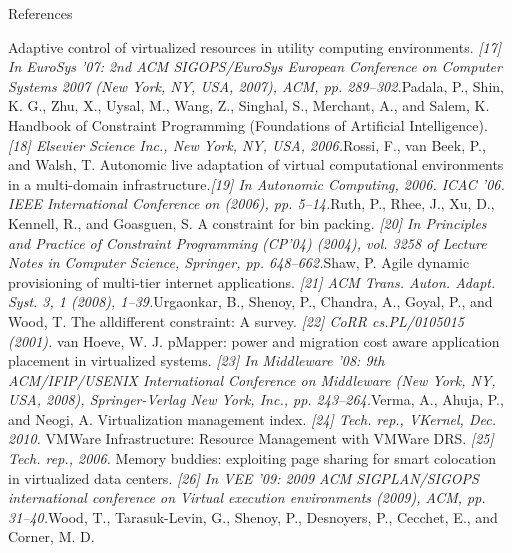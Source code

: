 \begin{frame}[allowframebreaks]{References}
\begin{thebibliography}{2}
{\beamertemplatearticlebibitems {} Adaptive control of virtualized resources in utility computing environments. \newblock\emph{[17] In EuroSys ’07: 2nd ACM SIGOPS/EuroSys European Conference on Computer Systems 2007 (New York, NY, USA, 2007), ACM, pp. 289–302.}\newblock Padala, P., Shin, K. G., Zhu, X., Uysal, M., Wang, Z., Singhal, S., Merchant, A., and Salem, K.
\beamertemplatearticlebibitems {} Handbook of Constraint Programming (Foundations of Artificial Intelligence). \newblock\emph{[18] Elsevier Science Inc., New York, NY, USA, 2006.}\newblock Rossi, F., van Beek, P., and Walsh, T. 
\beamertemplatearticlebibitems {} Autonomic live adaptation of virtual computational environments in a multi-domain infrastructure.\newblock\emph{[19]  In Autonomic Computing, 2006. ICAC ’06. IEEE International Conference on (2006), pp. 5–14.}\newblock Ruth, P., Rhee, J., Xu, D., Kennell, R., and Goasguen, S. 
\beamertemplatearticlebibitems {} A constraint for bin packing. \newblock\emph{[20] In Principles and Practice of Constraint Programming (CP’04) (2004), vol. 3258 of Lecture Notes in Computer Science, Springer, pp. 648–662.}\newblock Shaw, P. 
\beamertemplatearticlebibitems {} Agile dynamic provisioning of multi-tier internet applications. \newblock\emph{[21] ACM Trans. Auton. Adapt. Syst. 3, 1 (2008), 1–39.}\newblock Urgaonkar, B., Shenoy, P., Chandra, A., Goyal, P., and Wood, T. 
\beamertemplatearticlebibitems {} The alldifferent constraint: A survey. \newblock\emph{[22] CoRR cs.PL/0105015 (2001). }\newblock van Hoeve, W. J. 
\beamertemplatearticlebibitems {} pMapper: power and migration cost aware application placement in virtualized systems. \newblock\emph{[23] In Middleware ’08: 9th ACM/IFIP/USENIX International Conference on Middleware (New York, NY, USA, 2008), Springer-Verlag New York, Inc., pp. 243–264.}\newblock Verma, A., Ahuja, P., and Neogi, A. 
\beamertemplatearticlebibitems {} Virtualization management index. \newblock\emph{[24] Tech. rep., VKernel, Dec. 2010.}\newblock
\beamertemplatearticlebibitems {} VMWare Infrastructure: Resource Management with VMWare DRS. \newblock\emph{[25]  Tech. rep., 2006.}\newblock
\beamertemplatearticlebibitems {} Memory buddies: exploiting page sharing for smart colocation in virtualized data centers. \newblock\emph{[26] In VEE ’09: 2009 ACM SIGPLAN/SIGOPS international conference on Virtual execution environments (2009), ACM, pp. 31–40.}\newblock Wood, T., Tarasuk-Levin, G., Shenoy, P., Desnoyers, P., Cecchet, E., and Corner, M. D. 
}
\end{thebibliography}
\end{frame}
